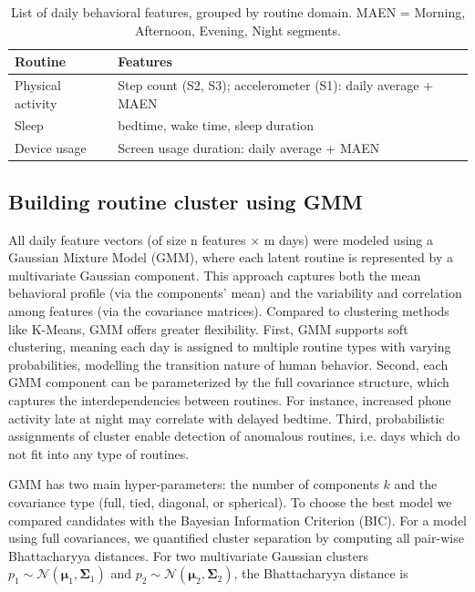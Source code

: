 \documentclass[pdflatex,sn-vancouver,Numbered]{bst/sn-jnl}%
\theoremstyle{thmstyleone}%
\theoremstyle{thmstyletwo}%
\theoremstyle{thmstylethree}%
\begin{document}
\begin{table}[ht]
    \centering
    \begin{tabular}{ll}
        \toprule
        \textbf{Routine} & \textbf{Features} \\
        \midrule
        Physical activity & Step count (S2, S3); accelerometer (S1): daily average + MAEN \\
        Sleep             & bedtime, wake time, sleep duration \\
        Device usage      & Screen usage duration: daily average + MAEN \\
        \bottomrule
    \end{tabular}
    \caption{List of daily behavioral features, grouped by routine domain. MAEN = Morning, Afternoon, Evening, Night segments.}
    \label{tab:features_list}
\end{table}

\subsection*{Building routine cluster using GMM}\label{sec:methods:building_cluster}

All daily feature vectors (of size n features × m days) were modeled using a Gaussian Mixture Model (GMM), where each latent routine is represented by a multivariate Gaussian component. This approach captures both the mean behavioral profile (via the components' mean) and the variability and correlation among features (via the covariance matrices).
Compared to clustering methods like K-Means, GMM offers greater flexibility. First, GMM supports soft clustering, meaning each day is assigned to multiple routine types with varying probabilities, modelling the transition nature of human behavior. Second, each GMM component can be parameterized by the full covariance structure, which captures the interdependencies between routines. For instance, increased phone activity late at night may correlate with delayed bedtime. Third, probabilistic assignments of cluster enable detection of anomalous routines, i.e. days which do not fit into any type of routines.

GMM has two main hyper-parameters: the number of components \(k\) and the covariance type (full, tied, diagonal, or spherical). 
To choose the best model we compared candidates with the Bayesian Information Criterion (BIC). 
For a model using full covariances, we quantified cluster separation by computing all pair-wise Bhattacharyya distances. 
For two multivariate Gaussian clusters \(p_1 \sim \mathcal{N}(\boldsymbol{\mu}_1, \boldsymbol{\Sigma}_1)\) and \(p_2 \sim \mathcal{N}(\boldsymbol{\mu}_2, \boldsymbol{\Sigma}_2)\), the Bhattacharyya distance is
\end{document}
